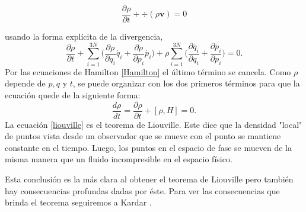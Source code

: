 \begin{equation} \label{con}
 \frac{\partial \rho}{\partial t} + \div{ ( \rho\mathbf{v} ) }=0
\end{equation}

usando la forma explícita de la divergencia,
\begin{equation}
 \frac{\partial \rho}{\partial t} +\sum_{i=1}^{3N} \Big( \frac{\partial\rho}{\partial q_{i}}\dot{q_{i}}+  \frac{\partial\rho}{\partial p_{i}}\dot{p_{i}} \Big) + \rho \sum_{i=1}^{3N} \Big( \frac{\partial \dot{q_{i}}}{\partial q_{i}} + \frac{\partial \dot{p_{i}}}{\partial p_{i}}\Big)=0.
\end{equation}
Por las ecuaciones de Hamilton \ref{Hamilton} el último término se cancela. Como $\rho$ depende de $p,q$ y $t$, se puede organizar con los dos primeros términos para que la ecuación quede de la siguiente forma:
\begin{equation} \label{liouville}
\frac{d \rho}{dt}= \frac{\partial \rho}{\partial t} + [ \rho, H ]=0.
\end{equation}
La ecuación \ref{liouville} es el teorema de Liouville. Este dice que la densidad "local" de puntos vista desde un observador que se mueve con el punto se mantiene constante en el tiempo. Luego, los puntos en el espacio de fase se mueven de la misma manera que un fluido incompresible en el espacio físico.

Esta conclusión es la más clara al obtener el teorema de Liouville pero también hay consecuencias profundas dadas por éste. Para ver las consecuencias que brinda el teorema seguiremos a Kardar \cite{KardarStat}.

